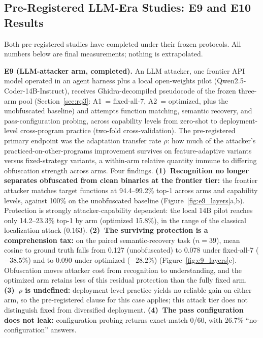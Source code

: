 \documentclass[5p,times,authoryear]{elsarticle}
\theoremstyle{plain}
\theoremstyle{definition}
\theoremstyle{remark}
\begin{document}
\subsection{Pre-Registered LLM-Era Studies: E9 and E10 Results}
\label{sec:ongoing}

Both pre-registered studies have completed under their frozen protocols. All
numbers below are final measurements; nothing is extrapolated.

\textbf{E9 (LLM-attacker arm, completed).} An LLM attacker, one frontier API model
operated in an agent harness plus a local open-weights pilot
(Qwen2.5-Coder-14B-Instruct), receives Ghidra-decompiled pseudocode of the frozen
three-arm pool (Section~\ref{sec:rq3}: A1~= fixed-all-7, A2~= optimized, plus the
unobfuscated baseline) and attempts function matching, semantic recovery, and
pass-configuration probing, across capability levels from zero-shot to
deployment-level cross-program practice (two-fold cross-validation). The
pre-registered primary endpoint was the adaptation transfer rate $\rho$: how much of
the attacker's practiced-on-other-programs improvement survives on feature-adaptive
variants versus fixed-strategy variants, a within-arm relative quantity immune to
differing obfuscation strength across arms. Four findings.
\textbf{(1)~Recognition no longer separates obfuscated from clean binaries at the
frontier tier:} the frontier attacker matches target functions at 94.4--99.2\% top-1
across arms and capability levels, against 100\% on the unobfuscated baseline
(Figure~\ref{fig:e9_layers}a,b). Protection is strongly attacker-capability
dependent: the local 14B pilot reaches only 14.2--23.3\% top-1 by arm (optimized
15.8\%), in the range of the classical localization attack (0.163).
\textbf{(2)~The surviving protection is a comprehension tax:} on the paired
semantic-recovery task ($n=39$), mean cosine to ground truth falls from 0.127
(unobfuscated) to 0.078 under fixed-all-7 ($-38.5\%$) and to 0.090 under optimized
($-28.2\%$) (Figure~\ref{fig:e9_layers}c). Obfuscation moves attacker cost from
recognition to understanding, and the optimized arm retains less of this residual
protection than the fully fixed arm. \textbf{(3)~$\rho$ is undefined:}
deployment-level practice yields no reliable gain on either arm, so the
pre-registered clause for this case applies; this attack tier does not distinguish
fixed from diversified deployment. \textbf{(4)~The pass configuration does not leak:}
configuration probing returns exact-match 0/60, with 26.7\% ``no-configuration''
answers.
\end{document}
